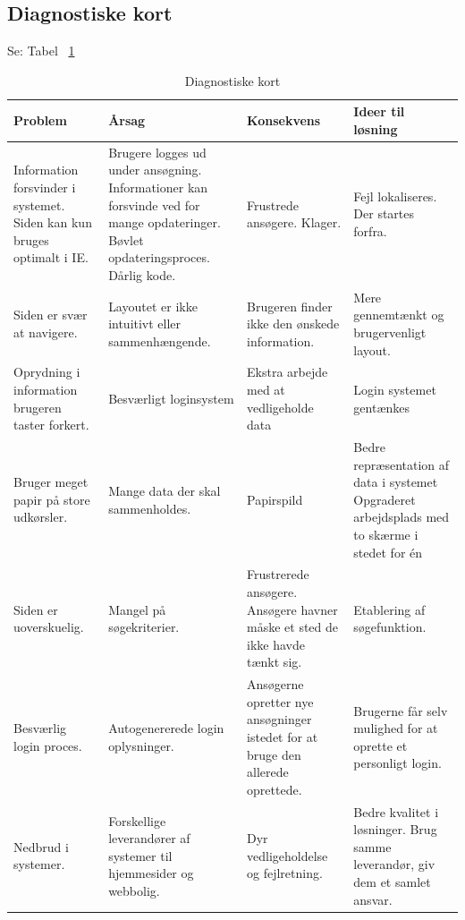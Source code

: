 \documentclass[12pt, a4paper]{report}
\begin{document}
\subsection{Diagnostiske kort}
Se: Tabel ~\ref{d_kort}
\begin{table}[p!]
\caption{Diagnostiske kort}
\label{d_kort}
\begin{tabular}{| p{} | p{} | p{} | p{} |}
\hline
Problem & Årsag & Konsekvens & Ideer til løsning \\ \hline
Information forsvinder i systemet. \newline Siden kan kun bruges optimalt i IE. & Brugere logges ud under ansøgning. \newline Informationer kan forsvinde ved for mange opdateringer. \newline Bøvlet opdateringsproces. \newline Dårlig kode. & Frustrede ansøgere. \newline Klager. & Fejl lokaliseres. \newline Der startes forfra. \\ \hline

Siden er svær at navigere. & Layoutet er ikke intuitivt eller sammenhængende. & Brugeren finder ikke den ønskede information. & Mere gennemtænkt og brugervenligt layout. \\ \hline

Oprydning i information brugeren taster forkert. & Besværligt loginsystem & Ekstra arbejde med at vedligeholde data & Login systemet gentænkes \\ \hline

Bruger meget papir på store udkørsler. & Mange data der skal sammenholdes. & Papirspild & Bedre repræsentation af data i systemet \newline Opgraderet arbejdsplads med to skærme i stedet for én \\ \hline

Siden er uoverskuelig. & Mangel på søgekriterier. & Frustrerede ansøgere. \newline Ansøgere havner måske et sted de ikke havde tænkt sig. & Etablering af søgefunktion. \\ \hline

Besværlig login proces. & Autogenererede login oplysninger. & Ansøgerne opretter nye ansøgninger istedet for at bruge den allerede oprettede. & Brugerne får selv mulighed for at oprette et personligt login. \\ \hline

Nedbrud i systemer. & Forskellige leverandører af systemer til hjemmesider og webbolig. & Dyr vedligeholdelse og fejlretning. & Bedre kvalitet i løsninger. \newline Brug samme leverandør, giv dem et samlet ansvar. \\ \hline

\end{tabular}
\end{table}
\end{document}
